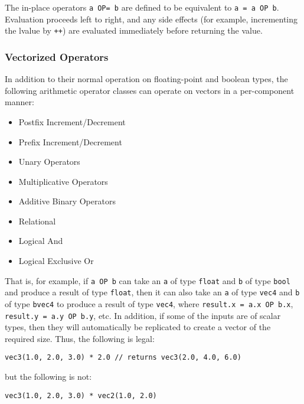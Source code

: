\documentclass[11pt]{article}
\newcommand{\code}[1]{\texttt{#1}}
\begin{document}
\begin{tabular}{| l | l | l | l |}
\end{tabular}

\vspace{3mm}

The in-place operators \code{a OP= b} are defined to be equivalent to \code{a = a OP b}. Evaluation proceeds left to right, and any side effects (for example, incrementing the lvalue by \code{++}) are evaluated immediately before returning the value.

\subsubsection{Vectorized Operators} \label{vectorized}

In addition to their normal operation on floating-point and boolean types, the following arithmetic operator classes can operate on vectors in a per-component manner:

\begin{itemize}
	\item Postfix Increment/Decrement
	\item Prefix Increment/Decrement
	\item Unary Operators
	\item Multiplicative Operators
	\item Additive Binary Operators
	\item Relational
	\item Logical And
	\item Logical Exclusive Or
\end{itemize}

That is, for example, if \code{a OP b} can take an \code{a} of type \code{float} and \code{b} of type \code{bool} and produce a result of type \code{float}, then it can also take an \code{a} of type \code{vec4} and \code{b} of type \code{bvec4} to produce a result of type \code{vec4}, where \code{result.x = a.x OP b.x}, \code{result.y = a.y OP b.y}, etc. In addition, if some of the inputs are of scalar types, then they will automatically be replicated to create a vector of the required size. Thus, the following is legal:

\begin{lstlisting}
vec3(1.0, 2.0, 3.0) * 2.0 // returns vec3(2.0, 4.0, 6.0)
\end{lstlisting}

but the following is not:

\begin{lstlisting}
vec3(1.0, 2.0, 3.0) * vec2(1.0, 2.0)
\end{lstlisting}
\end{document}
